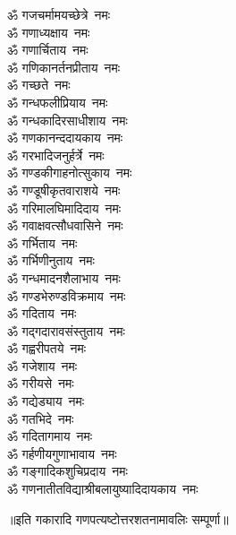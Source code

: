 \begin{flushleft}
\begin{multicols}{2}
ॐ गजचर्मामयच्छेत्रे~नमः\\
ॐ गणाध्यक्षाय~नमः\\
ॐ गणार्चिताय~नमः\\
ॐ गणिकानर्तनप्रीताय~नमः\\
ॐ गच्छते~नमः\\
ॐ गन्धफलीप्रियाय~नमः\\
ॐ गन्धकादिरसाधीशाय~नमः\\
ॐ गणकानन्ददायकाय~नमः\\
ॐ गरभादिजनुर्हर्त्रे~नमः\\
ॐ गण्डकीगाहनोत्सुकाय~नमः\hfill{}\\
ॐ गण्डूषीकृतवाराशये~नमः\\
ॐ गरिमालघिमादिदाय~नमः\\
ॐ गवाक्षवत्सौधवासिने~नमः\\
ॐ गर्भिताय~नमः\\
ॐ गर्भिणीनुताय~नमः\\
ॐ गन्धमादनशैलाभाय~नमः\\
ॐ गण्डभेरुण्डविक्रमाय~नमः\\
ॐ गदिताय~नमः\\
ॐ गद्गदारावसंस्तुताय~नमः\\
ॐ गह्वरीपतये~नमः\hfill{}\\
ॐ गजेशाय~नमः\\
ॐ गरीयसे~नमः\\
ॐ गद्येड्याय~नमः\\
ॐ गतभिदे~नमः\\
ॐ गदितागमाय~नमः\\
ॐ गर्हणीयगुणाभावाय~नमः\\
ॐ गङ्गादिकशुचिप्रदाय~नमः\\
ॐ गणनातीतविद्याश्री\-बलायुष्यादिदायकाय~नमः\\
\end{multicols}
\end{flushleft}
॥इति गकारादि गणपत्यष्टोत्तरशतनामावलिः सम्पूर्णा॥

